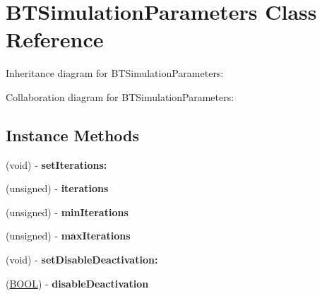 \hypertarget{interface_b_t_simulation_parameters}{\section{B\+T\+Simulation\+Parameters Class Reference}
\label{interface_b_t_simulation_parameters}
}


Inheritance diagram for B\+T\+Simulation\+Parameters\+:


Collaboration diagram for B\+T\+Simulation\+Parameters\+:
\subsection*{Instance Methods}
\begin{DoxyCompactItemize}
\item 
\hypertarget{interface_b_t_simulation_parameters_a9ed457469f3e0a46bd9e9e1ecdd0f9e6}{(void) -\/ {\bfseries set\+Iterations\+:}}\label{interface_b_t_simulation_parameters_a9ed457469f3e0a46bd9e9e1ecdd0f9e6}

\item 
\hypertarget{interface_b_t_simulation_parameters_a8806742d725d971814f691401b563ced}{(unsigned) -\/ {\bfseries iterations}}\label{interface_b_t_simulation_parameters_a8806742d725d971814f691401b563ced}

\item 
\hypertarget{interface_b_t_simulation_parameters_a9e7cf6a77b5465df0d40c4496f88c6a9}{(unsigned) -\/ {\bfseries min\+Iterations}}\label{interface_b_t_simulation_parameters_a9e7cf6a77b5465df0d40c4496f88c6a9}

\item 
\hypertarget{interface_b_t_simulation_parameters_a2ab9f3ef90bb7e54429efdee3b7c5c4b}{(unsigned) -\/ {\bfseries max\+Iterations}}\label{interface_b_t_simulation_parameters_a2ab9f3ef90bb7e54429efdee3b7c5c4b}

\item 
\hypertarget{interface_b_t_simulation_parameters_af4e007d0a4ec2b18259b75e5e287d6d3}{(void) -\/ {\bfseries set\+Disable\+Deactivation\+:}}\label{interface_b_t_simulation_parameters_af4e007d0a4ec2b18259b75e5e287d6d3}

\item 
\hypertarget{interface_b_t_simulation_parameters_afc95812050b94603becce6118d08cc05}{(\hyperlink{_ice_types_8h_a050c65e107f0c828f856a231f4b4e788}{B\+O\+O\+L}) -\/ {\bfseries disable\+Deactivation}}\label{interface_b_t_simulation_parameters_afc95812050b94603becce6118d08cc05}


\end{DoxyCompactItemize}
